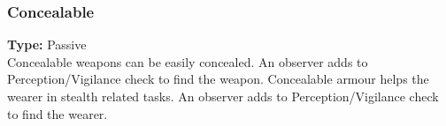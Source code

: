 \subsubsection{Concealable}
\label{iqty:concealable}
\textbf{Type:} Passive\\
Concealable weapons can be easily concealed. An
observer adds \setback to Perception/Vigilance
check to find the weapon.
Concealable armour helps the wearer in stealth related tasks.
An observer adds \setback to Perception/Vigilance
check to find the wearer.
